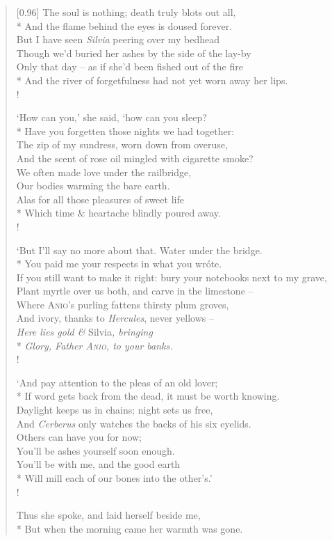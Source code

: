 \begin{verse}[0.96\textwidth]
    The soul is nothing; death truly blots out all,\\*
    \vin And the flame behind the eyes is doused forever.\\
    But I have seen \textit{Silvia} peering over my bedhead\\
    \vin Though we'd buried her ashes by the side of the lay-by\\
    Only that day -- as if she'd been fished out of the fire\\*
    \vin And the river of forgetfulness had not yet worn away her lips.\\!

    `How can you,' she said, `how can you sleep?\\*
    \vin Have you forgetten those nights we had together:\\
    The zip of my sundress, worn down from overuse,\\
    \vin And the scent of rose oil mingled with cigarette smoke?\\
    We often made love under the railbridge,\\
    \vin Our bodies warming the bare earth.\\
    Alas for all those pleasures of sweet life\\*
    \vin Which time \& heartache blindly poured away.\\!

    `But I'll say no more about that. Water under the bridge.\nobreak\\*
    \vin You paid me your respects in what you wr\'ote.\\
    If you still want to make it right: bury your notebooks next to my grave,\\
    \vin Plant myrtle over us both, and carve in the limestone --\\
    Where \textsc{Anio}'s purling fattens thirsty plum groves,\\
    \vin And ivory, thanks to \textit{Hercules}, never yellows --\\
    \textit{Here lies gold \& }Silvia\textit{, bringing}\\*
    \vin \textit{Glory, Father \textsc{Anio}, to your banks.}\\!

    `And pay attention to the pleas of an old lover;\\*
    \vin If word gets back from the dead, it must be worth knowing.\\
    Daylight keeps us in chains; night sets us free,\\
    \vin And \textit{Cerberus} only watches the backs of his six eyelids.\nobreak\\
    Others can have you for now;\\
    \vin You'll be ashes yourself soon enough.\\
    You'll be with me, and the good earth\\*
    \vin Will mill each of our bones into the other's.'\\!

    Thus she spoke, and laid herself beside me,\\*
    \vin But when the morning came her warmth was gone.
\end{verse}
